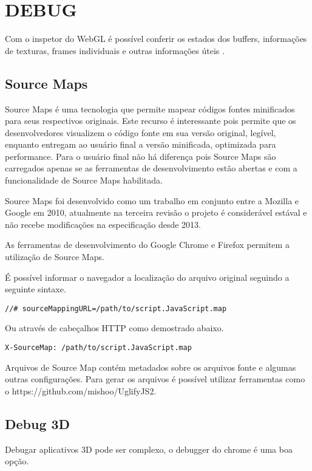 \section{DEBUG}
\begin{draft}
Com o inspetor do WebGL é possível conferir os estados dos buffers, informações de texturas, frames individuais e outras informações úteis \autocite{html5mostwanted}.
\end{draft}

\subsection{Source Maps}

Source Maps é uma tecnologia que permite mapear códigos fontes
minificados para seus respectivos originais. Este recurso é
interessante pois permite que os desenvolvedores visualizem o código
fonte em sua versão original, legível, enquanto entregam ao usuário
final a versão minificada, optimizada para performance.
Para o usuário final não há diferença pois Source Maps são
carregados apenas se as ferramentas de desenvolvimento estão abertas e
com a funcionalidade de Source Maps habilitada.

Source Maps foi desenvolvido como um trabalho em conjunto entre a
Mozilla e Google em 2010, atualmente na terceira revisão o projeto é
considerável estával e não recebe modificações na especificação
desde 2013.

As ferramentas de desenvolvimento do Google Chrome e Firefox permitem a
utilização de Source Maps.

É possível informar o navegador a localização do arquivo original
seguindo a seguinte sintaxe.

\begin{verbatim}
//# sourceMappingURL=/path/to/script.JavaScript.map
\end{verbatim}

Ou através de cabeçalhos HTTP como demostrado abaixo.

\begin{verbatim}
X-SourceMap: /path/to/script.JavaScript.map
\end{verbatim}

Arquivos de Source Map contém metadados sobre os arquivos fonte e
algumas outras configurações.
Para gerar os arquivos é possível utilizar ferramentas como o
https://github.com/mishoo/UglifyJS2.

\begin{draft}
\subsection{Debug 3D}
Debugar aplicativos 3D pode ser complexo, o debugger do chrome é uma boa opção.

\end{draft}
